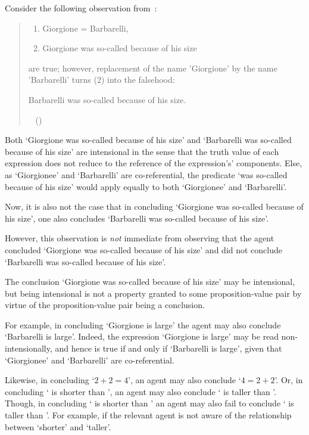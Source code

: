 \begin{note}[Intensionality]
  Consider the following observation from~\citeauthor{Quine:1943vf}:

  \begin{quote}
    \begin{enumerate}[label=(\arabic*)]
    \item
      Giorgione = Barbarelli,
    \item
      Giorgione was so-called because of his size
    \end{enumerate}
    are true; however, replacement of the name 'Giorgione' by the name 'Barbarelli' turns (2) into the falsehood:

    \begin{center}
      Barbarelli was so-called because of his size.
    \end{center}
    \vspace{-\baselineskip}
    \mbox{ }\nolinebreak
    \mbox{}\hfill\mbox{(\Citeyear[113]{Quine:1943vf})}
  \end{quote}

  Both `Giorgione was so-called because of his size' and `Barbarelli was so-called because of his size' are intensional in the sense that the truth value of each expression does not reduce to the reference of the expression's' components.
  Else, as `Giorgionee' and `Barbarelli' are co-referential, the predicate `was so-called because of his size' would apply equally to both `Giorgionee' and `Barbarelli'.

  Now, it is also not the case that in concluding `Giorgione was so-called because of his size', one also concludes `Barbarelli was so-called because of his size'.

  However, this observation is \emph{not} immediate from observing that the agent concluded `Giorgione was so-called because of his size' and did not conclude `Barbarelli was so-called because of his size'.

  The conclusion `Giorgione was so-called because of his size' may be intensional, but being intensional is not a property granted to some proposition-value pair by virtue of the proposition-value pair being a conclusion.

  For example, in concluding `Giorgione is large' the agent may also conclude `Barbarelli is large'.
  Indeed, the expression `Giorgione is large' may be read non-intensionally, and hence is true if and only if `Barbarelli is large', given that `Giorgionee' and `Barbarelli' are co-referential.

  Likewise, in concluding `\(2 + 2 = 4\)', an agent may also conclude `\(4 = 2 + 2\)'.
  Or, in concluding ` is shorter than ', an agent may also conclude ` is taller than '.
  Though, in concluding ` is shorter than ' an agent may also fail to conclude ` is taller than '.
  For example, if the relevant agent is not aware of the relationship between `shorter' and `taller'.
\end{note}

